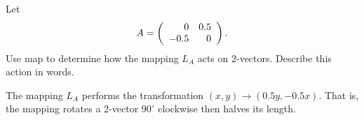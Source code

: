 \documentclass{ximera}
\begin{document}
\begin{exercise} \label{c4.3.14}
Let
\[
A = \left(\begin{array}{rr} 0 & 0.5\\ -0.5 &0\end{array}\right).
\]
Use {\sf map} to determine how the mapping $L_A$ acts on $2$-vectors.
Describe this action in words.

\begin{solution}

The mapping $L_A$ performs the transformation $(x,y) \rightarrow
(0.5y, -0.5x)$.  That is, the mapping rotates a 2-vector
$90^\circ$ clockwise then halves its length.

\end{solution}
\end{exercise}
\end{document}
